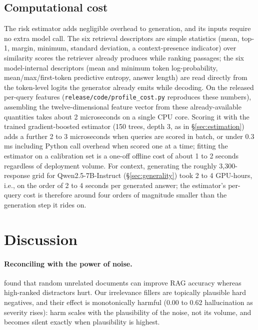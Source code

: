 \documentclass[sn-basic]{sn-jnl}
\theoremstyle{thmstyleone}
\theoremstyle{thmstyletwo}
\begin{document}
\subsection{Computational cost}\label{sec:cost}
The risk estimator adds negligible overhead to generation, and its inputs
require no extra model call. The six retrieval descriptors are simple
statistics (mean, top-1, margin, minimum, standard deviation, a
context-presence indicator) over similarity scores the retriever already
produces while ranking passages; the six model-internal descriptors (mean
and minimum token log-probability, mean/max/first-token predictive
entropy, answer length) are read directly from the token-level logits the
generator already emits while decoding. On the released per-query
features (\texttt{release/code/profile\_cost.py} reproduces these
numbers), assembling the twelve-dimensional feature vector from these
already-available quantities takes about 2 microseconds on a single CPU
core. Scoring it with the trained gradient-boosted estimator (150 trees,
depth 3, as in \S\ref{sec:estimation}) adds a further 2 to 3 microseconds
when queries are scored in batch, or under 0.3 ms including Python
call overhead when scored one at a time; fitting the estimator on a
calibration set is a one-off offline cost of about 1 to 2 seconds
regardless of deployment volume. For context, generating the roughly
3{,}300-response grid for Qwen2.5-7B-Instruct (\S\ref{sec:generality})
took 2 to 4 GPU-hours, i.e., on the order of 2 to 4 seconds per generated
answer; the estimator's per-query cost is therefore around four orders
of magnitude smaller than the generation step it rides on.


\section{Discussion}\label{sec:discussion}

\paragraph{Reconciling with the power of noise.}
\citet{cuconasu2024power} found that random unrelated documents can improve RAG
accuracy whereas high-ranked distractors hurt. Our irrelevance fillers are
topically plausible hard negatives, and their effect is monotonically harmful
(0.00 to 0.62 hallucination as severity rises): harm scales with the
plausibility of the noise, not its volume, and becomes silent exactly when
plausibility is highest.
\end{document}
